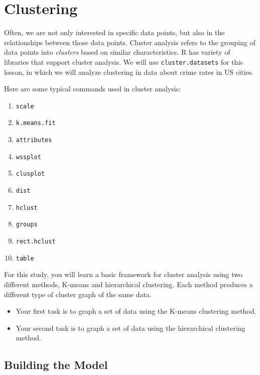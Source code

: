 \chapter{Clustering}

Often, we are not only interested in specific data points, but also in the relationships between those data points.
Cluster analysis refers to the grouping of data points into \emph{clusters} based on similar characteristics.
R has variety of libraries that support cluster analysis.
We will use \texttt{cluster.datasets} for this lesson, in which we will analyze clustering in data about crime rates in US cities. \cite{Novomestky}
\medskip

Here are some typical commands used in cluster analysis:

\begin{enumerate}
\item \texttt{scale}
\item \texttt{k.means.fit}
\item \texttt{attributes}
\item \texttt{wssplot}
\item \texttt{clusplot}
\item \texttt{dist}
\item \texttt{hclust}
\item \texttt{groups}
\item \texttt{rect.hclust}
\item \texttt{table}

\end{enumerate}


For this study, you will learn a basic framework for cluster analysis using two different methods, K-means and hierarchical clustering.
Each method produces a different type of cluster graph of the same data. 

\begin{itemize}

\item Your first task is to graph a set of data using the K-means clustering method.

\item Your second task is to graph a set of data using the hierarchical clustering method. 
 
\end{itemize}

\section{Building the Model}

